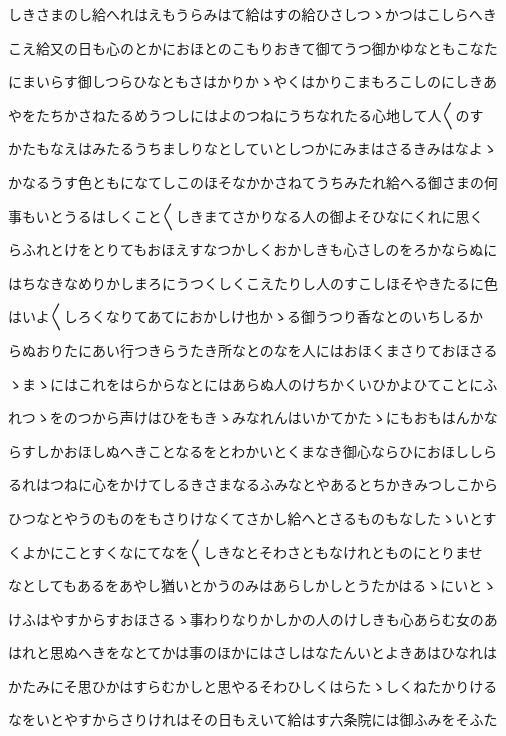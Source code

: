 \documentclass[a4paper,11pt,landscape]{ltjtarticle}
\begin{document}
しきさまのし給へれはえもうらみはて給はすの給ひさしつゝかつはこしらへき
\par\medskip
こえ給又の日も心のとかにおほとのこもりおきて御てうつ御かゆなともこなた
\par\medskip
にまいらす御しつらひなともさはかりかゝやくはかりこまもろこしのにしきあ
\par\medskip
やをたちかさねたるめうつしにはよのつねにうちなれたる心地して人〱のす
\par\medskip
かたもなえはみたるうちましりなとしていとしつかにみまはさるきみはなよゝ
\par\medskip
かなるうす色ともになてしこのほそなかかさねてうちみたれ給へる御さまの何
\par\medskip
事もいとうるはしくこと〱しきまてさかりなる人の御よそひなにくれに思く
\par\medskip
らふれとけをとりてもおほえすなつかしくおかしきも心さしのをろかならぬに
\par\medskip
はちなきなめりかしまろにうつくしくこえたりし人のすこしほそやきたるに色
\par\medskip
はいよ〱しろくなりてあてにおかしけ也かゝる御うつり香なとのいちしるか
\par\medskip
らぬおりたにあい行つきらうたき所なとのなを人にはおほくまさりておほさる
\par\medskip
ゝまゝにはこれをはらからなとにはあらぬ人のけちかくいひかよひてことにふ
\par\medskip
れつゝをのつから声けはひをもきゝみなれんはいかてかたゝにもおもはんかな
\par\medskip
らすしかおほしぬへきことなるをとわかいとくまなき御心ならひにおほししら
\par\medskip
るれはつねに心をかけてしるきさまなるふみなとやあるとちかきみつしこから
\par\medskip
ひつなとやうのものをもさりけなくてさかし給へとさるものもなしたゝいとす
\par\medskip
くよかにことすくなにてなを〱しきなとそわさともなけれとものにとりませ
\par\medskip
なとしてもあるをあやし猶いとかうのみはあらしかしとうたかはるゝにいとゝ
\par\medskip
けふはやすからすおほさるゝ事わりなりかしかの人のけしきも心あらむ女のあ
\par\medskip
はれと思ぬへきをなとてかは事のほかにはさしはなたんいとよきあはひなれは
\par\medskip
かたみにそ思ひかはすらむかしと思やるそわひしくはらたゝしくねたかりける
\par\medskip
なをいとやすからさりけれはその日もえいて給はす六条院には御ふみをそふた
\end{document}
